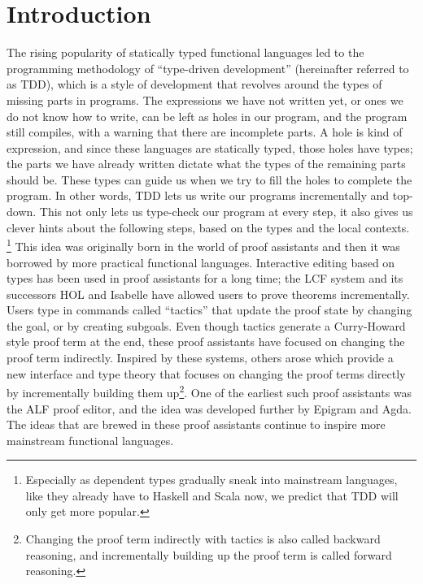 \chapter{Introduction} \label{chap:introduction}

The rising popularity of statically typed functional languages led to
the programming methodology of ``type-driven development'' (hereinafter referred to as TDD),
which is a style of development that revolves around the types of missing parts in
programs. The expressions we have not written yet, or ones we do not know
how to write, can be left as holes in our program, and the program still
compiles, with a warning that there are incomplete parts.
A hole is kind of expression, and since these languages are
statically typed, those holes have types; the parts
we have already written dictate what the types of the remaining parts should
be. These types can guide us when we try to fill the holes to complete the program.
In other words, TDD lets us write our programs incrementally and top-down. This
not only lets us type-check our program at every step, it also gives us clever
hints about the following steps, based on the types and the local contexts.
\footnote{Especially as dependent types gradually sneak into mainstream
languages, like they already have to Haskell\cite{eisenberg} and
Scala\cite{scalaDep} now, we predict that TDD will only get more popular.}
This idea was originally born in the world of proof assistants and then it was
borrowed by more practical functional languages.
Interactive editing based on types has been used in proof assistants for a long
time; the LCF system\cite{lcf} and its successors HOL and
Isabelle\cite{isabelle} have allowed users to prove theorems
incrementally. Users type in commands called ``tactics'' that update the proof state by
changing the goal, or by creating subgoals.
Even though tactics generate a Curry-Howard style proof term at the end, these
proof assistants have focused on changing the proof term indirectly.
Inspired by these systems, others arose which
provide a new interface and type theory that focuses on
changing the proof terms directly by incrementally building them
up\footnote{Changing the proof term indirectly with tactics is also called
backward reasoning, and incrementally building up the proof term is called
forward reasoning.}. One of the earliest such proof assistants was the ALF proof
editor\cite{ALF}, and the idea was developed further by Epigram\cite{epigram}
and Agda\cite{agda}.
The ideas that are brewed in these proof assistants continue to inspire more
mainstream functional languages.

